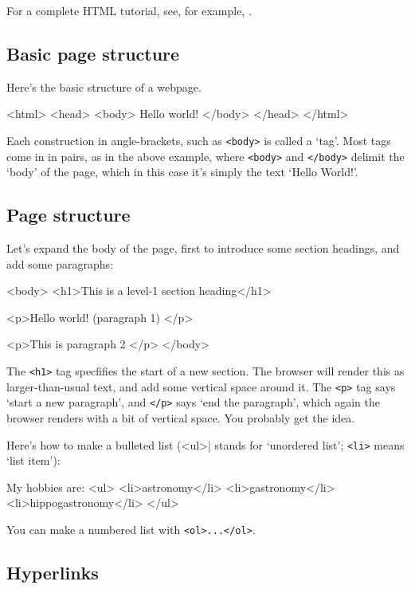 For a complete HTML tutorial, see, for example,
.

\subsection{Basic page structure}

Here's the basic structure of a webpage.

\begin{ttoutenv}
<html>
<head>
<body>
Hello world!
</body>
</head>
</html>
\end{ttoutenv}

Each construction in angle-brackets, such as \verb|<body>| is called a
`tag'. Most tags come in in pairs, as in the above example, where
\verb|<body>| and \verb|</body>| delimit the `body' of the page, which
in this case it's simply the text `Hello World!'.

\subsection{Page structure}

Let's expand the body of the page, first to introduce some section
headings, and add some paragraphs:

\begin{ttoutenv}
<body>
<h1>This is a level-1 section heading</h1>

<p>Hello world! (paragraph 1) </p>

<p>This is paragraph 2 </p>
</body>
\end{ttoutenv}

The \verb|<h1>| tag specfifies the start of a new section. The browser
will render this as larger-than-usual text, and add some vertical
space around it. The \verb|<p>| tag says `start a new paragraph', and
\verb|</p>| says `end the paragraph', which again the browser renders
with a bit of vertical space. You probably get the idea.

Here's how to make a bulleted list (\verb||<ul>| stands for `unordered
list'; \verb|<li>| means `list item'):

\begin{ttoutenv}
My hobbies are:
<ul>
<li>astronomy</li>
<li>gastronomy</li>
<li>hippogastronomy</li>
</ul>
\end{ttoutenv}

You can make a numbered list with \verb|<ol>...</ol>|.

\subsection{Hyperlinks}

